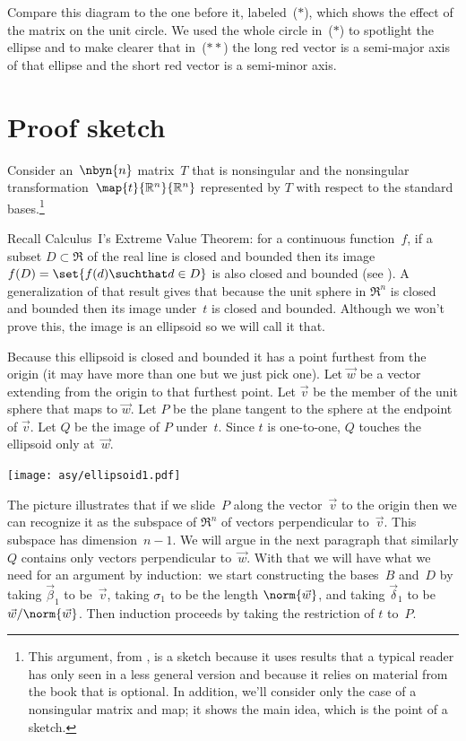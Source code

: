 Compare this diagram to the one before it, 
labeled~($*$), which shows the effect of the matrix
on the unit circle.
We used the whole circle in~($*$) to spotlight the ellipse and 
to make clearer that in~($**$)
the long red vector is a
semi-major axis of that ellipse and the short red vector is a 
semi-minor axis.



\section{Proof sketch}

Consider an~$\nbyn{n}$ matrix~$T$ that is nonsingular and the
nonsingular transformation~$\map{t}{\Re^n}{\Re^n}$ represented by
$T$ with respect to the standard bases.\footnote{%
  This argument, 
  from \protect\cite{BlankKrikorianSpring89},
  is a sketch because it uses results that a typical reader has only 
  seen in a less general version and because it relies on material from the
  book that is optional.
  In addition, we'll consider only the case of a nonsingular matrix and map;
  it shows the main idea, which is the point of a sketch.}

Recall Calculus~I's Extreme Value Theorem: for a continuous
function~$f$, if a subset $D\subset \Re$ of the real line 
is closed and bounded then
its image $f(D)=\set{f(d)\suchthat d\in D}$ 
is also closed and bounded (see \cite{wiki:ExtremeValueThm}).
A generalization of that result gives that because the unit sphere in $\Re^n$
is closed and bounded then its image under~$t$ is closed and bounded.
Although we won't prove this, the image is an ellipsoid
so we will call it that. 

Because this ellipsoid is closed and bounded it has a 
point furthest from the origin (it may have more than one but we just pick one).
Let $\vec{w}$ be a vector extending from the origin to that furthest point.
Let $\vec{v}$ be the member of the unit sphere that maps to $\vec{w}$.
Let $P$ be the plane tangent to the sphere at the endpoint of $\vec{v}$.
Let $Q$ be the image of $P$ under~$t$.
Since $t$ is one-to-one, $Q$ touches the ellipsoid only at~$\vec{w}$.
\begin{center}
  \texttt{[image: asy/ellipsoid1.pdf]}
\end{center}

The picture illustrates that if we slide~$P$ along the 
vector~$\vec{v}$ to
the origin then we can recognize it as 
the subspace of $\Re^n$ of vectors perpendicular
to~$\vec{v}$.
This subspace has dimension~$n-1$. 
We will argue in the next paragraph 
that similarly $Q$ contains only
vectors perpendicular to~$\vec{w}$.
With that we will have what we need for an argument by induction:~we 
start constructing the 
bases~$B$ and~$D$ by taking $\vec{\beta}_1$ to be~$\vec{v}$, taking
$\sigma_1$ to be the length $\norm{\vec{w}}$, and taking
$\vec{\delta}_1$ to be $\vec{w}/\norm{\vec{w}}$.
Then induction proceeds by taking the restriction of $t$ to~$P$.

